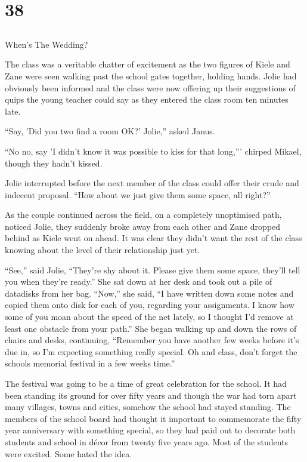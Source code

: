 \chapter{38}
\section{}
When's The Wedding?  

The class was a veritable chatter of excitement as the two figures of Kiele and Zane were seen walking past the school gates together, holding hands.  Jolie had obviously been informed and the class were now offering up their suggestions of quips the young teacher could say as they entered the class room ten minutes late.

``Say, 'Did you two find a room OK?' Jolie,'' asked Janus.  

``No no, say 'I didn't know it was possible to kiss for that long,''' chirped Mikael, though they hadn't kissed.

Jolie interrupted before the next member of the class could offer their crude and indecent proposal.  ``How about we just give them some space, all right?''

As the couple continued across the field, on a completely unoptimised path, noticed Jolie, they suddenly broke away from each other and Zane dropped behind as Kiele went on ahead.  It was clear they didn't want the rest of the class knowing about the level of their relationship just yet.

``See,'' said Jolie, ``They're shy about it.  Please give them some space, they'll tell you when they're ready.''  She sat down at her desk and took out a pile of datadisks from her bag.  ``Now,'' she said, ``I have written down some notes and copied them onto disk for each of you, regarding your assignments.  I know how some of you moan about the speed of the net lately, so I thought I'd remove at least one obstacle from your path.''  She began walking up and down the rows of chairs and desks, continuing, ``Remember you have another few weeks before it's due in, so I'm expecting something really special.  Oh and class, don't forget the schools memorial festival in a few weeks time.''

The festival was going to be a time of great celebration for the school.  It had been standing its ground for over fifty years and though the war had torn apart many villages, towns and cities, somehow the school had stayed standing.  The members of the school board had thought it important to commemorate the fifty year anniversary with something special, so they had paid out to decorate both students and school in décor from twenty five years ago.  Most of the students were excited.  Some hated the idea.

